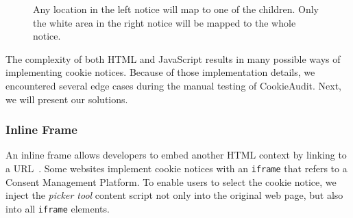 \begin{figure}
	\centering
	\begin{minipage}{0.48\textwidth}
		\centering
	\end{minipage}\hfill
	\begin{minipage}{0.48\textwidth}
		\centering
	\end{minipage}
	\caption{Any location in the left notice will map to one of the children. Only the white area in the right notice will be mapped to the whole notice.}
	\label{fig:notice-fillout}
\end{figure}

The complexity of both HTML and JavaScript results in many possible ways of implementing cookie notices.
Because of those implementation details, we encountered several edge cases during the manual testing of CookieAudit.
Next, we will present our solutions.

\subsubsection{Inline Frame}
An inline frame allows developers to embed another HTML context by linking to a URL~\cite{iframeMdn}.
Some websites implement cookie notices with an \verb|iframe| that refers to a Consent Management Platform.
To enable users to select the cookie notice, we inject the \emph{picker tool} content script not only into the original web page, but also into all \verb|iframe| elements.

